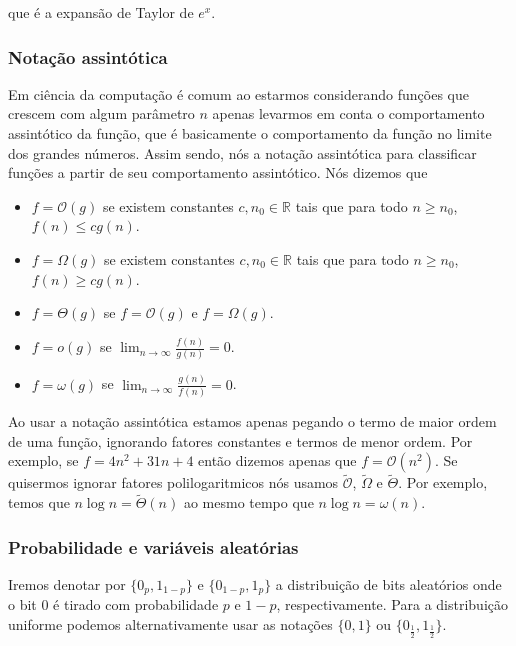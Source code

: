 que é a expansão de Taylor de $e^{x}$.

\subsubsection{Notação assintótica}

Em ciência da computação é comum ao estarmos considerando funções que crescem com algum parâmetro $n$ apenas levarmos em conta o comportamento assintótico da função, que é basicamente o comportamento da função no limite dos grandes números. Assim sendo, nós a notação assintótica para classificar funções a partir de seu comportamento assintótico. Nós dizemos que

\begin{itemize}

    \item $f = \mathcal{O}(g)$ se existem constantes $c, n_{0} \in \mathbb{R}$ tais que para todo $n \geq n_{0}$, $f(n) \leq cg(n)$.
    
    \item $f = \Omega(g)$ se existem constantes $c, n_{0} \in \mathbb{R}$ tais que para todo $n \geq n_{0}$, $f(n) \geq cg(n)$.
    
    \item $f = \Theta(g)$ se $f = \mathcal{O}(g)$ e $f = \Omega(g)$.
    
    \item $f = o(g)$ se $\lim_{n \to \infty} \frac{f(n)}{g(n)} = 0$.
    
    \item $f = \omega(g)$ se $\lim_{n \to \infty} \frac{g(n)}{f(n)} = 0$.

\end{itemize}

Ao usar a notação assintótica estamos apenas pegando o termo de maior ordem de uma função, ignorando fatores constantes e termos de menor ordem. Por exemplo, se $f = 4n^{2} + 31n + 4$ então dizemos apenas que $f = \mathcal{O}(n^{2})$. Se quisermos ignorar fatores polilogaritmicos nós usamos $\widetilde{\mathcal{O}}$, $\widetilde{\Omega}$ e $\widetilde{\Theta}$. Por exemplo, temos que $n\log n = \widetilde{\Theta}(n)$ ao mesmo tempo que $n\log n = \omega(n)$.

\subsubsection{Probabilidade e variáveis aleatórias}

Iremos denotar por $\{0_{p}, 1_{1 - p}\}$ e $\{0_{1 - p}, 1_{p}\}$ a distribuição de bits aleatórios onde o bit 0 é tirado com probabilidade $p$ e $1 - p$, respectivamente. Para a distribuição uniforme podemos alternativamente usar as notações $\{0, 1\}$ ou $\{0_{\frac{1}{2}}, 1_{\frac{1}{2}}\}$.

